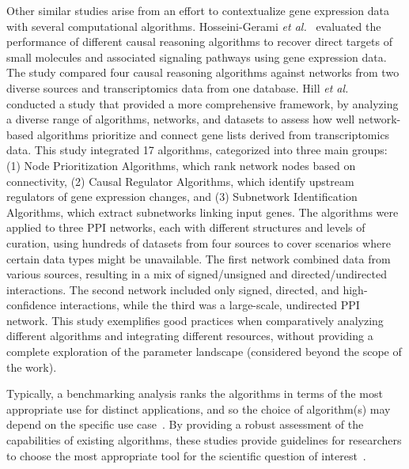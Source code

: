 Other similar studies arise from an effort to contextualize gene expression data with several computational algorithms. Hosseini-Gerami \textit{et al.}~\cite{RN53} evaluated the performance of different causal reasoning algorithms to recover direct targets of small molecules and associated signaling pathways using gene expression data. The study compared four causal reasoning algorithms against networks from two diverse sources and transcriptomics data from  one database. Hill \textit{et al.}~\cite{RN37} conducted a study that provided a more comprehensive framework, by analyzing a diverse range of algorithms, networks, and datasets to assess how well network-based algorithms prioritize and connect gene lists derived from transcriptomics data. This study integrated 17 algorithms, categorized into three main groups: (1) Node Prioritization Algorithms, which rank network nodes based on connectivity, (2) Causal Regulator Algorithms, which identify upstream regulators of gene expression changes, and (3) Subnetwork Identification Algorithms, which extract subnetworks linking input genes. The algorithms were applied to three PPI networks, each with different structures and levels of curation, using hundreds of datasets from four sources to cover scenarios where certain data types might be unavailable. The first network combined data from various sources, resulting in a mix of signed/unsigned and directed/undirected interactions. The second network included only signed, directed, and high-confidence interactions, while the third was a large-scale, undirected PPI network. This study exemplifies good practices when comparatively analyzing different algorithms and integrating different resources, without providing a complete exploration of the parameter landscape (considered beyond the scope of the work).

Typically, a benchmarking analysis ranks the algorithms in terms of the most appropriate use for distinct applications, and so the choice of algorithm(s) may depend on the specific use case~\cite{RN37}. By providing a robust assessment of the capabilities of existing algorithms, these studies provide guidelines for researchers to choose the most appropriate tool for the scientific question of interest~\cite{RN108}.

